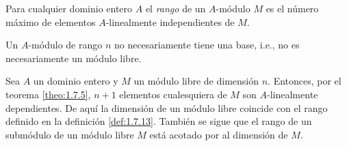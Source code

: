 \begin{definition}[Hola]\label{def:1.7.13}%
  Para cualquier dominio entero $A$ el \emph{rango} de un $A$-módulo $M$ es el número máximo de elementos $A$-linealmente independientes de $M$.
\end{definition}

Un $A$-módulo de rango $n$ no necesariamente tiene una base, i.e., no es necesariamente un módulo libre.

Sea $A$ un dominio entero y $M$ un módulo libre de dimensión $n$. Entonces, por el teorema \ref{theo:1.7.5}, $n+1$ elementos cualesquiera de $M$ son $A$-linealmente dependientes. De aquí la dimensión de un módulo libre coincide con el rango definido en la definición \ref{def:1.7.13}. También se sigue que el rango de un submódulo de un módulo libre $M$ está acotado por al dimensión de $M$.

